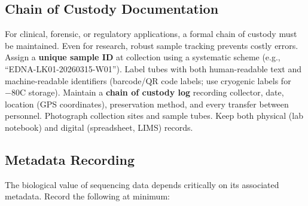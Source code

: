 \subsection{Chain of Custody Documentation}
\label{subsec:protocols:custody}

For clinical, forensic, or regulatory applications, a formal chain of custody must be maintained. Even for research, robust sample tracking prevents costly errors. Assign a \textbf{unique sample ID} at collection using a systematic scheme (e.g., ``EDNA-LK01-20260315-W01''). Label tubes with both human-readable text and machine-readable identifiers (barcode/QR code labels; use cryogenic labels for $-80$\textdegree C storage). Maintain a \textbf{chain of custody log} recording collector, date, location (GPS coordinates), preservation method, and every transfer between personnel. Photograph collection sites and sample tubes. Keep both physical (lab notebook) and digital (spreadsheet, LIMS) records.

\subsection{Metadata Recording}
\label{subsec:protocols:metadata}

The biological value of sequencing data depends critically on its associated metadata. Record the following at minimum:

